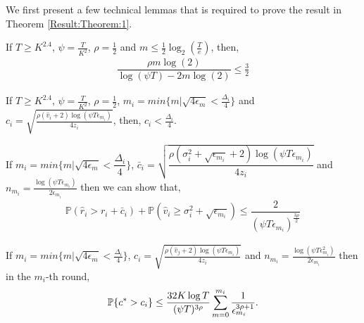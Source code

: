 We first present a few technical lemmas that is required  to prove the result in Theorem \ref{Result:Theorem:1}.

\begin{lemma}
\label{proofTheorem:Lemma:1}
If $T\geq K^{2.4}$, $\psi=\frac{T}{ K^2}$, $\rho=\frac{1}{2}$ and $m\leq \frac{1}{2} \log_2\left(\frac{T}{e}\right) $, then,
\begin{align*}
\dfrac{\rho m \log(2)}{\log(\psi T) - 2m\log( 2)} \leq \frac{3}{2}
\end{align*}
\end{lemma}



\begin{lemma}
\label{proofTheorem:Lemma:2}
If $T\geq K^{2.4}$, $\psi=\frac{T}{ K^2}$, $\rho =\frac{1}{2}$, $m_i = min\lbrace m|\sqrt{4\epsilon_{m} } < \frac{\Delta_i}{4} \rbrace $ and $c_{i} =\sqrt{\frac{\rho (\hat{v}_i + 2)\log (\psi T\epsilon_{m_{i}})}{4 z_i}}$, then, $c_{i} < \frac{\Delta_i}{4}$.
\end{lemma}



\begin{lemma}
\label{proofTheorem:Lemma:3}
If $m_i = min\lbrace m|\sqrt{4\epsilon_{m} } < \dfrac{\Delta_i}{4} \rbrace $,  $\bar{c}_i=\sqrt{\dfrac{\rho (\sigma_{i}^{2}+\sqrt{\epsilon_{m_{i}}} + 2)\log(\psi T\epsilon_{m_{i}})}{4z_i}}$ and $n_{m_i} = \frac{\log{(\psi T\epsilon_{m_{i}})}}{2\epsilon_{m_{i}}}$ then we can show that,
\begin{align*}
\mathbb{P}\left( \hat{r}_{i} > r_{i}+ \bar{c}_i\right) 
+ \mathbb{P}\left( \hat{v}_{i}\geq \sigma_{i}^{2}+\sqrt{\epsilon_{m_{i}}}\right) \leq \dfrac{2}{(\psi  T\epsilon_{m_{i}})^{\frac{3\rho}{2}}}
\end{align*}
\end{lemma}



\begin{lemma}
\label{proofTheorem:Lemma:4}
If $m_i = min\lbrace m|\sqrt{4\epsilon_{m} } < \frac{\Delta_i}{4} \rbrace $, $c_{i} =\sqrt{\frac{\rho(\hat{v}_j + 2)\log (\psi T\epsilon_{m_{i}})}{4 z_{i}}}$ and $n_{m_i}=\frac{\log{(\psi T\epsilon_{m_{i}}^{2})}}{2\epsilon_{m_{i}}}$ then in the $m_i$-th round, 
\begin{align*}
\mathbb{P}\lbrace c^{*} > c_i \rbrace \leq \dfrac{32K\log T}{(\psi T)^{3\rho}}\sum_{m=0}^{m_i}\dfrac{1}{\epsilon_{m_i}^{3\rho + 1}}. 
\end{align*}
\end{lemma}



